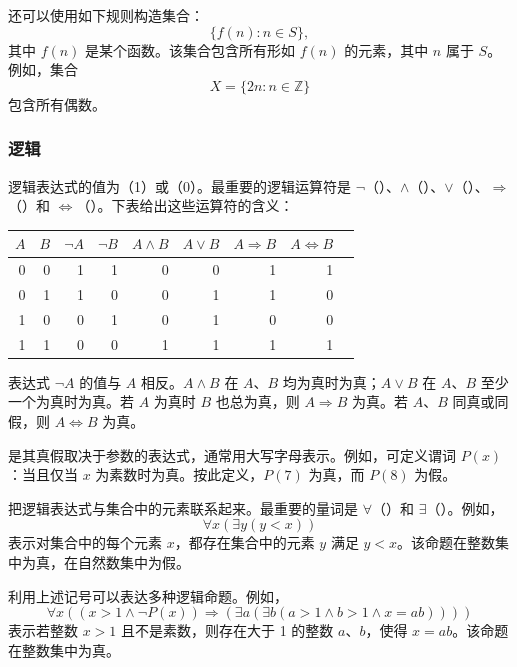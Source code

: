 还可以使用如下规则构造集合：
\[\{f(n) : n \in S\},\]
其中 $f(n)$ 是某个函数。该集合包含所有形如 $f(n)$ 的元素，其中 $n$ 属于 $S$。例如，集合
\[X=\{2n : n \in \mathbb{Z}\}\]
包含所有偶数。

\subsubsection{逻辑}


逻辑表达式的值为（1）或（0）。最重要的逻辑运算符是 $\lnot$（）、$\land$（）、$\lor$（）、$\Rightarrow$（）和 $\Leftrightarrow$（）。下表给出这些运算符的含义：

\begin{center}
\begin{tabular}{rr|rrrrrrr}
$A$ & $B$ & $\lnot A$ & $\lnot B$ & $A \land B$ & $A \lor B$ & $A \Rightarrow B$ & $A \Leftrightarrow B$ \\
\hline
0 & 0 & 1 & 1 & 0 & 0 & 1 & 1 \\
0 & 1 & 1 & 0 & 0 & 1 & 1 & 0 \\
1 & 0 & 0 & 1 & 0 & 1 & 0 & 0 \\
1 & 1 & 0 & 0 & 1 & 1 & 1 & 1 \\
\end{tabular}
\end{center}

表达式 $\lnot A$ 的值与 $A$ 相反。$A \land B$ 在 $A$、$B$ 均为真时为真；$A \lor B$ 在 $A$、$B$ 至少一个为真时为真。若 $A$ 为真时 $B$ 也总为真，则 $A \Rightarrow B$ 为真。若 $A$、$B$ 同真或同假，则 $A \Leftrightarrow B$ 为真。


是其真假取决于参数的表达式，通常用大写字母表示。例如，可定义谓词 $P(x)$：当且仅当 $x$ 为素数时为真。按此定义，$P(7)$ 为真，而 $P(8)$ 为假。


把逻辑表达式与集合中的元素联系起来。最重要的量词是 $\forall$（）和 $\exists$（）。例如，
\[\forall x (\exists y (y < x))\]
表示对集合中的每个元素 $x$，都存在集合中的元素 $y$ 满足 $y<x$。该命题在整数集中为真，在自然数集中为假。

利用上述记号可以表达多种逻辑命题。例如，
\[\forall x ((x>1 \land \lnot P(x)) \Rightarrow (\exists a (\exists b (a > 1 \land b > 1 \land x = ab))))\]
表示若整数 $x>1$ 且不是素数，则存在大于 1 的整数 $a$、$b$，使得 $x=ab$。该命题在整数集中为真。

